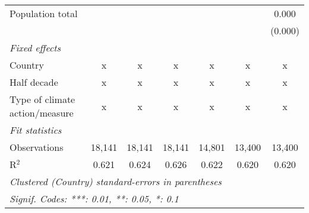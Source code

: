 \begin{tabular}{lcccccc}
   Population total                                                   &             &               &               &                &                & 0.000\\   
                                                                      &             &               &               &                &                & (0.000)\\   
   \emph{Fixed effects}\\
   Country                                                            & x           & x             & x             & x              & x              & x\\  
   Half decade                                                        & x           & x             & x             & x              & x              & x\\  
   Type of climate action/measure                                     & x           & x             & x             & x              & x              & x\\  
   \midrule \emph{Fit statistics}\\
   Observations                                                       & 18,141      & 18,141        & 18,141        & 14,801         & 13,400         & 13,400\\  
   R$^2$                                                              & 0.621       & 0.624         & 0.626         & 0.622          & 0.620          & 0.620\\  
   \midrule
   \multicolumn{7}{l}{\emph{Clustered (Country) standard-errors in parentheses}}\\
   \multicolumn{7}{l}{\emph{Signif. Codes: ***: 0.01, **: 0.05, *: 0.1}}\\
\end{tabular}
\par\endgroup


